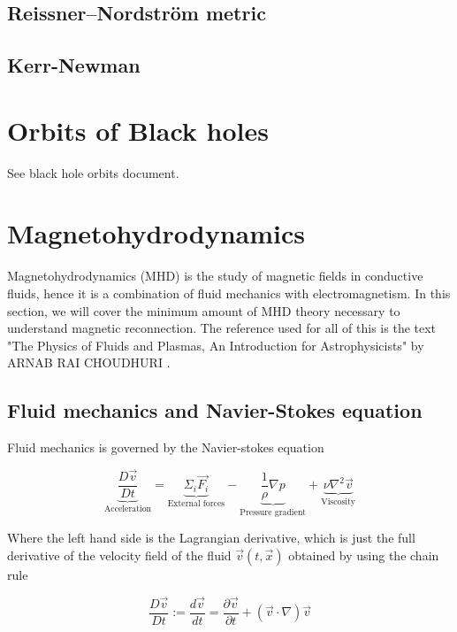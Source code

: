 \documentclass{article}
\begin{document}
\subsection{Reissner–Nordström metric}

\subsection{Kerr-Newman}

\section{Orbits of Black holes}\label{sec:Orbits}

See black hole orbits document.


\section{Magnetohydrodynamics}

Magnetohydrodynamics (MHD) is the study of magnetic fields in conductive fluids, hence it is a combination of fluid mechanics with electromagnetism. In this section, we will cover the minimum amount of MHD theory necessary to understand magnetic reconnection. The reference used for all of this is the text "The Physics of Fluids and Plasmas, An Introduction for Astrophysicists" by ARNAB RAI CHOUDHURI \cite{choudhuri_1998}.

\subsection{Fluid mechanics and Navier-Stokes equation}
Fluid mechanics is governed by the Navier-stokes equation

\begin{equation}\label{eq:Navier-Stokes}
    \underbrace{\frac{D \Vec{v}}{Dt}}_{\text{Acceleration}} = 
    \underbrace{\Sigma_{i}\Vec{F_i}}_{\text{External forces}} - 
    \underbrace{\frac{1}{\rho} \nabla p}_{\text{Pressure gradient}} + 
    \underbrace{\nu \nabla^2 \Vec{v}}_{\text{Viscosity}}
\end{equation}

Where the left hand side is the Lagrangian derivative, which is just the full derivative of the velocity field of the fluid 
$\Vec{v}(t,\Vec{x})$ obtained by using the chain rule


\begin{equation}
    \frac{D\Vec{v}}{Dt} := \frac{d\Vec{v}}{dt} = \frac{\partial \Vec{v}}{\partial t} + (\Vec{v}\cdot\nabla)\Vec{v}
\end{equation}
\end{document}
